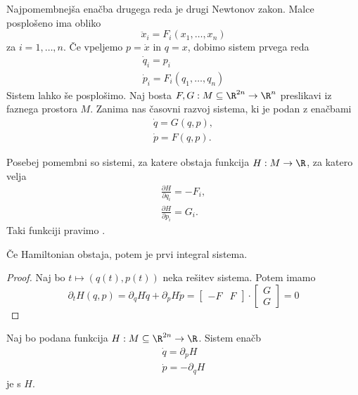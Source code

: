 
Najpomembnejša enačba drugega reda je drugi Newtonov zakon.
Malce posplošeno ima obliko
\[
  \ddot{x}_i = F_i(x_1, \ldots, x_n)
\]
za $i = 1, \ldots, n$.
Če vpeljemo $p = \dot{x}$ in $q = x$, dobimo sistem prvega reda
\begin{gather*}
  \dot{q}_i = p_i \\
  \dot{p}_i = F_i(q_1, \ldots, q_n)
\end{gather*}
Sistem lahko še posplošimo.
Naj bosta $F, G : M \subseteq \R^{2n} \to \R^n$ preslikavi iz faznega prostora
$M$.
Zanima nas časovni razvoj sistema, ki je podan z enačbami
\begin{gather*}
  \dot{q} = G(q, p), \\
  \dot{p} = F(q, p).
\end{gather*}

Posebej pomembni so sistemi, za katere obstaja funkcija $H : M \to \R$, za
katero velja
\begin{gather*}
  \frac{\partial H}{\partial q_i} = -F_i, \\
  \frac{\partial H}{\partial p_i} = G_i.
\end{gather*}
Taki funkciji pravimo .

\begin{izrek}
  Če Hamiltonian obstaja, potem je prvi integral sistema.
\end{izrek}

\begin{proof}
  Naj bo $t \mapsto (q(t), p(t))$ neka rešitev sistema.
  Potem imamo
  \[
	\partial_t H(q, p)
	= \partial_q H \dot{q} + \partial_p H \dot{p}
	=
	\begin{bmatrix}
	  - F & F
	\end{bmatrix}
	\cdot
	\begin{bmatrix}
	  G \\ G
	\end{bmatrix}
	= 0
  \]
\end{proof}


\begin{definicija}
  Naj bo podana funkcija $H : M \subseteq \R^{2n} \to \R$.
  Sistem enačb
  \begin{gather*}
	\dot{q} = \partial_p H \\
	\dot{p} = -\partial_q H
  \end{gather*}
  je  s  $H$.
\end{definicija}

